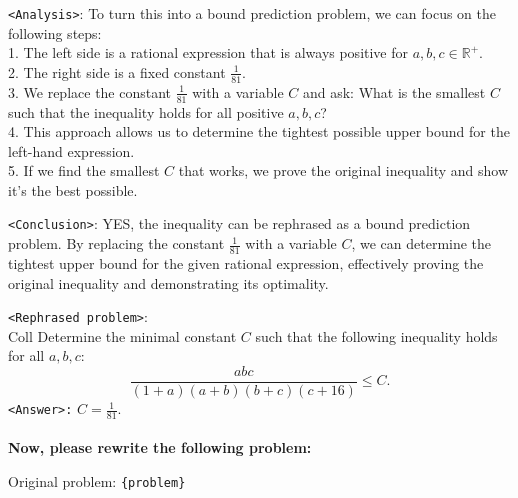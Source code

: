 \begin{textcolorbox}
\vspace{2mm}
\texttt{<Analysis>}: To turn this into a bound prediction problem, we can focus on the following steps: \\
1. The left side is a rational expression that is always positive for $a, b, c \in \mathbb{R}^{+}$. \\
2. The right side is a fixed constant $\frac{1}{81}$.\\
3. We replace the constant $\frac{1}{81}$ with a variable $C$ and ask: What is the smallest $C$ such that the inequality holds for all positive $a, b, c$?\\
4. This approach allows us to determine the tightest possible upper bound for the left-hand expression.\\
5. If we find the smallest $C$ that works, we prove the original inequality and show it's the best possible.

\vspace{2mm}
\texttt{<Conclusion>}: YES, the inequality can be rephrased as a bound prediction problem. By replacing the constant $\frac{1}{81}$ with a variable $C$, we can determine the tightest upper bound for the given rational expression, effectively proving the original inequality and demonstrating its optimality.

\vspace{2mm}
\texttt{<Rephrased problem>}: \\
Coll  Determine the minimal constant $C$ such that the following inequality holds for all $a, b, c$:
$$
\frac{abc}{(1+a)(a+b)(b+c)(c+16)} \leq C.
$$
\texttt{<Answer>:} $C = \frac{1}{81}$.
\\\\
\textbf{Now, please rewrite the following problem:}

Original problem: \texttt{\{problem\}}
\end{textcolorbox}